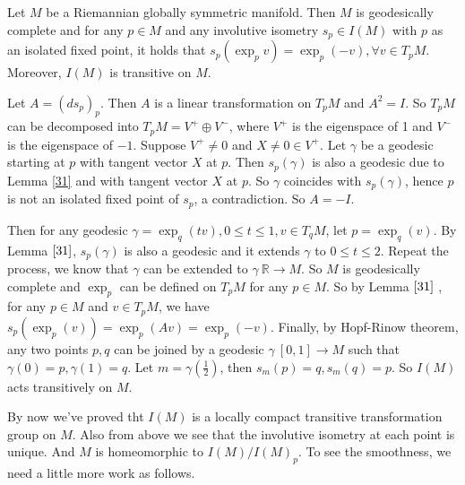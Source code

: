 \begin{theorem}
	Let $M$ be a Riemannian globally symmetric manifold. Then $M$
	is geodesically complete and for any $p \in M$ and any
	involutive isometry $s_{p} \in I(M)$ with $p$ as an isolated
	fixed point, it holds that $s_{p}\left( \exp _{p} v
	\right)=\exp _{p}(-v), \forall v \in T_{p} M$.
	Moreover, $I(M)$ is transitive on $M$.
\end{theorem}
\bproof
Let $A=\left( d s_{p} \right)_{p}$. Then $A$ is a linear
transformation on $T_{p} M$ and $A^{2}=I$. So $T_{p} M$ can be
decomposed into $T_{p} M = V^{+} \oplus V^{-}$, where $V^{+}$ is
the eigenspace of 1 and $V^{-}$ is the eigenspace of $-1 .$
Suppose $V^{+} \neq 0$ and
$X \neq 0 \in V^{+}$. Let $\gamma$ be a geodesic starting at $p$
with tangent vector $X$ at $p$.
Then $s_{p}(\gamma)$ is also a geodesic due to Lemma \ref{31} and
with tangent vector $X$ at $p$. So $\gamma$ coincides with
$s_{p}(\gamma)$, hence $p$ is not an isolated fixed point of
$s_{p}$,
a contradiction. So $A=-I .$

Then for any geodesic $\gamma = \exp _{q}(t v), 0 \leq t \leq 1,
v \in T_{q} M$, let $p = \exp _{q}(v) .$ By
Lemma $\ref{31}$, $s_{p}(\gamma)$ is also a geodesic and it
extends $\gamma$ to $0 \leq t \leq 2$. Repeat the process, we
know that $\gamma$ can be extended to $\gamma\: \mathbb{R}
\rightarrow M .$ So $M$ is geodesically complete and $\exp _{p}$
can be defined on $T_{p} M$ for any $p \in M$. So by Lemma
$\ref{31}$ , for any $p \in M$ and $v \in T_{p} M$, we have
$s_{p}\left( \exp _{p}(v) \right)=\exp _{p}(A v)=\exp _{p}(-v)$.
Finally, by Hopf-Rinow theorem, any two points $p, q$ can be
joined by a geodesic $\gamma\:[0,1] \rightarrow M$ such that
$\gamma(0) = p, \gamma(1) = q$. Let $m=\gamma\left( \frac{1}{2}
\right)$, then $s_{m}(p)=q, s_{m}(q)=p .$ So $I(M)$ acts
transitively on $M$.
\eproof

	By now we've proved tht $I(M)$ is a locally compact
	transitive transformation group on $M$. Also from above we
	see that the involutive isometry at each point is unique. And
	$M$ is homeomorphic to $I(M) / I(M)_p$. To see the
	smoothness, we need a little more work as follows.


